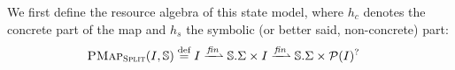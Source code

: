 We first define the resource algebra of this state model, where $h_c$ denotes the concrete part of the map and $h_s$ the symbolic (or better said, non-concrete) part:
\begin{align*}
	\SplitPMap(I,\mmdl) &\defeq I \finmap \mmdl.\Sigma \times I \finmap\mmdl.\Sigma \times \pset(I)^?

\end{align*}
